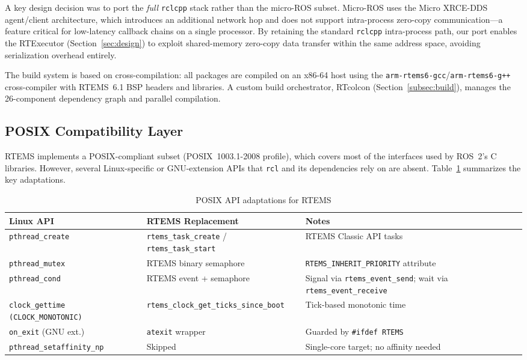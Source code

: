 A key design decision was to port the \emph{full} \texttt{rclcpp} stack rather than the micro-ROS subset.
Micro-ROS uses the Micro XRCE-DDS agent/client architecture, which introduces an additional network hop and does not support intra-process zero-copy communication---a feature critical for low-latency callback chains on a single processor.
By retaining the standard \texttt{rclcpp} intra-process path, our port enables the RTExecutor (Section~\ref{sec:design}) to exploit shared-memory zero-copy data transfer within the same address space, avoiding serialization overhead entirely.

The build system is based on cross-compilation: all packages are compiled on an x86-64 host using the \texttt{arm-rtems6-gcc}/\texttt{arm-rtems6-g++} cross-compiler with RTEMS~6.1 BSP headers and libraries.
A custom build orchestrator, RTcolcon (Section~\ref{subsec:build}), manages the 26-component dependency graph and parallel compilation.

\subsection{POSIX Compatibility Layer}
\label{subsec:posix}

RTEMS implements a POSIX-compliant subset (POSIX~1003.1-2008 profile), which covers most of the interfaces used by ROS~2's C libraries.
However, several Linux-specific or GNU-extension APIs that \texttt{rcl} and its dependencies rely on are absent.
Table~\ref{tab:posix_adaptations} summarizes the key adaptations.

\begin{table}[t]
\centering
\caption{POSIX API adaptations for RTEMS}
\label{tab:posix_adaptations}
\begin{tabular}{p{2.1cm}p{2.1cm}p{3.0cm}}
\hline
\textbf{Linux API} & \textbf{RTEMS Replacement} & \textbf{Notes} \\
\hline
\texttt{pthread\_create} & \texttt{rtems\_task\_create} / \texttt{rtems\_task\_start} & RTEMS Classic API tasks \\
\texttt{pthread\_mutex} & RTEMS binary semaphore & \texttt{RTEMS\_INHERIT\_PRIORITY} attribute \\
\texttt{pthread\_cond} & RTEMS event + semaphore & Signal via \texttt{rtems\_event\_send}; wait via \texttt{rtems\_event\_receive} \\
\texttt{clock\_gettime (CLOCK\_MONOTONIC)} & \texttt{rtems\_clock\_get\_ticks\_since\_boot} & Tick-based monotonic time \\
\texttt{on\_exit} (GNU ext.) & \texttt{atexit} wrapper & Guarded by \texttt{\#ifdef RTEMS} \\
\texttt{pthread\_setaffinity\_np} & Skipped & Single-core target; no affinity needed \\
\hline
\end{tabular}
\end{table}

